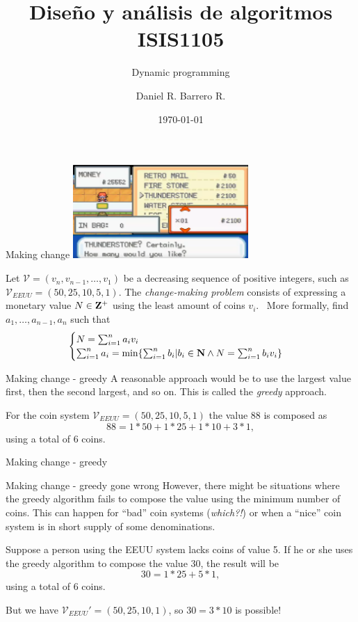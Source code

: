\documentclass{beamer}
\title{Diseño y análisis de algoritmos\\ ISIS1105}
\subtitle{Dynamic programming}
\author{Daniel R. Barrero R.}
\date{\today}
\begin{document}
\frame{\titlepage}

%

\begin{frame}{Making change}
	\includegraphics[width=0.5\textwidth]{pokeshopping.png}

	\bigskip
	Let $\mathcal{V}= (v_n, v_{n-1}, \ldots, v_1)$ be a decreasing sequence of
	positive integers, such as $\mathcal{V}_{EEUU}= (50,25,10,5,1)$. The
	\emph{change-making problem} consists of expressing a monetary value
	$N \in \mathbf{Z}^+$ using the least amount of coins $v_i$.\pause
	\ More formally, find
	$a_1, \ldots, a_{n-1}, a_n$ such that
	\[
		\begin{cases}
			N = \sum_{i= 1}^n a_i v_i\\
			\sum_{i= 1}^n a_i = \min \{\sum_{i= 1}^n b_i | b_i \in \mathbf{N} \land N = \sum_{i= 1}^n b_iv_i\}
		\end{cases}
	\]
\end{frame}

%

\begin{frame}{Making change - greedy}
	A reasonable approach would be to use the largest value first, then the
	second largest, and so on. This is called the \emph{greedy} approach.

	\begin{exl}
		For the coin system $\mathcal{V}_{EEUU} = (50,25,10,5,1)$ the value
		88 is composed as
		\[
			88 = 1*50 + 1*25 + 1*10 + 3*1,
		\]
		using a total of 6 coins.
	\end{exl}
\end{frame}

%

\begin{frame}{Making change - greedy}
	
\end{frame}

%

\begin{frame}{Making change - greedy gone wrong}
	However, there might be situations where the greedy algorithm fails to
	compose the value using the minimum number of coins. This can happen for
	``bad'' coin systems (\emph{which?!}) or when a ``nice'' coin system is in
	short supply of some denominations.

	\begin{exl}
		Suppose a person using the EEUU system lacks coins of value 5. If
		he or she uses the greedy algorithm to compose the value 30, the
		result will be
		\[
			30 = 1*25 + 5*1,
		\]
		using a total of 6 coins.\pause

		\bigskip
		But we have $\mathcal{V}_{EEUU}' =
		(50,25,10,1)$, so $30 = 3*10$ is possible!
	\end{exl}
\end{frame}
\end{document}
